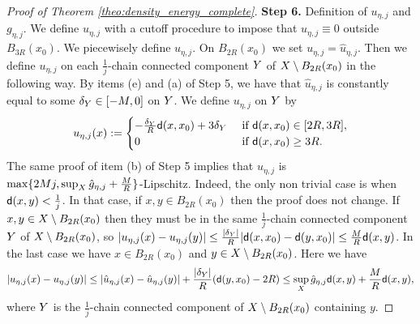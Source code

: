 \documentclass[12pt]{amsart}
\newcommand{\sfd}{{\sf d}}
\newcommand{\X}{{\rm X}}
\newcommand{\Y}{{\rm Y}}
\theoremstyle{definition}
\newcommand{\sfc}{{\sf c}}
\newcommand{\Chain}[1]{\mathscr{C}^{#1}}
\begin{document}
\begin{proof}[Proof of Theorem \ref{theo:density_energy_complete}]
    {\bf Step 6.} Definition of $u_{\eta,j}$ and $g_{\eta,j}$. We define $u_{\eta,j}$ with a cutoff procedure to impose that $u_{\eta,j} \equiv 0$ outside $B_{3R}(x_0)$. We piecewisely define $u_{\eta,j}$. On $B_{2R}(x_0)$ we set $u_{\eta,j} = \hat{u}_{\eta,j}$. Then we define $u_{\eta,j}$ on each $\frac{1}{j}$-chain connected component $\Y$ of $\X\setminus B_{2R}(x_0)$ in the following way.
    By items (e) and (a) of Step 5, we have that $\hat{u}_{\eta,j}$ is constantly equal to some $\delta_{\Y} \in [-M,0]$ on $\Y$. We define $u_{\eta,j}$ on $\Y$ by
            \begin{equation}
                u_{\eta,j}(x) :=
                \begin{cases}
                    -\frac{\delta_\Y}{R}\sfd(x,x_0) +3\delta_\Y &\text{ if } \sfd(x,x_0)\in [2R,3R],\\
                    0 &\text{ if } \sfd(x,x_0) \ge 3R.
                \end{cases}
            \end{equation}
        The same proof of item (b) of Step 5 implies that $u_{\eta,j}$ is $\max\{ 2Mj, \sup_\X \hat{g}_{\eta,j} + \frac{M}{R}\}$-Lipschitz. Indeed, the only non trivial case is when $\sfd(x,y) < \frac{1}{j}$. In that case, if $x,y \in B_{2R}(x_0)$ then the proof does not change. If $x,y \in \X \setminus B_{2R}(x_0)$ then they must be in the same $\frac{1}{j}$-chain connected component $\Y$ of $\X \setminus B_{2R}(x_0)$, so $\vert u_{\eta,j}(x) - u_{\eta,j}(y) \vert \le \frac{\vert \delta_Y \vert}{R}\vert \sfd(x,x_0) - \sfd(y,x_0) \vert \le \frac{M}{R} \sfd(x,y)$. In the last case we have $x\in B_{2R}(x_0)$ and $y\in \X\setminus B_{2R}(x_0)$. Here we have
        $$\vert u_{\eta,j}(x) - u_{\eta,j}(y) \vert \le \vert \hat{u}_{\eta,j}(x) - \hat{u}_{\eta,j}(y) \vert + \frac{\vert \delta_\Y \vert}{R} (\sfd(y,x_0) - 2R) \le \sup_{\X} \hat{g}_{\eta,j} \sfd(x,y) + \frac{M}{R} \sfd(x,y),$$
        where $\Y$ is the $\frac{1}{j}$-chain connected component of $\X \setminus B_{2R}(x_0)$ containing $y$.


\end{proof}
\end{document}
